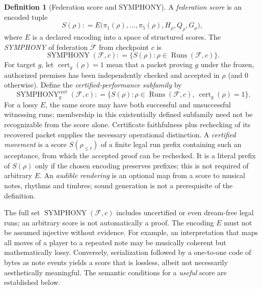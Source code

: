 \documentclass[11pt,letterpaper]{article}
\theoremstyle{definition}
\newtheorem{definition}[theorem]{Definition}
\theoremstyle{remark}
\newcommand{\Runs}{\operatorname{Runs}}
\newcommand{\Sym}{\operatorname{SYMPHONY}}
\newcommand{\defeq}{\mathrel{\mathop:}=}
\begin{document}
\begin{definition}[Federation score and SYMPHONY]
A \emph{federation score} is an encoded tuple
\begin{equation}\label{eq:score}
S(\rho)\defeq E\bigl(\pi_1(\rho),\ldots,\pi_5(\rho),H_\rho,Q_\rho,G_\rho\bigr),
\end{equation}
where $E$ is a declared encoding into a space of structured scores. The \emph{SYMPHONY} of federation $\mathcal F$ from checkpoint $c$ is
\begin{equation}\label{eq:sym}
\boxed{\Sym(\mathcal F,c)\defeq\{S(\rho):\rho\in\Runs(\mathcal F,c)\}.}
\end{equation}
For target $g$, let $\operatorname{cert}_g(\rho)=1$ mean that a packet proving $g$ under the frozen, authorized premises has been independently checked and accepted in $\rho$ (and $0$ otherwise). Define the \emph{certified-performance subfamily} by
\[
\Sym^{\mathrm{cert}}_g(\mathcal F,c)\defeq
\bigl\{S(\rho):\rho\in\Runs(\mathcal F,c),\ \operatorname{cert}_g(\rho)=1\bigr\}.
\]
For a lossy $E$, the same score may have both successful and unsuccessful witnessing runs; membership in this existentially defined subfamily need not be recognizable from the score alone. Certificate faithfulness plus rechecking of its recovered packet supplies the necessary operational distinction. A \emph{certified movement} is a score $S(\rho_{\le t})$ of a finite legal run prefix containing such an acceptance, from which the accepted proof can be rechecked. It is a literal prefix of $S(\rho)$ only if the chosen encoding preserves prefixes; this is not required of arbitrary $E$. An \emph{audible rendering} is an optional map from a score to musical notes, rhythms and timbres; sound generation is not a prerequisite of the definition.
\end{definition}

The full set $\Sym(\mathcal F,c)$ includes uncertified or even dream-free legal runs; an arbitrary score is not automatically a proof. The encoding $E$ must not be assumed injective without evidence. For example, an interpretation that maps all moves of a player to a repeated note may be musically coherent but mathematically lossy. Conversely, serialization followed by a one-to-one code of bytes as note events yields a score that is lossless, albeit not necessarily aesthetically meaningful. The semantic conditions for a \emph{useful} score are established below.
\end{document}
